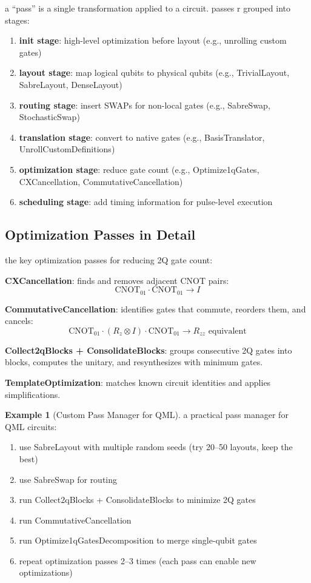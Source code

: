 \documentclass[11pt,a4paper]{article}
\theoremstyle{definition}
\newtheorem{example}{Example}[section]
\theoremstyle{remark}
\begin{document}
a ``pass'' is a single transformation applied to a circuit. passes r grouped into stages:

\begin{enumerate}[label=\arabic*.]
    \item \textbf{init stage}: high-level optimization before layout (e.g., unrolling custom gates)
    \item \textbf{layout stage}: map logical qubits to physical qubits (e.g., TrivialLayout, SabreLayout, DenseLayout)
    \item \textbf{routing stage}: insert SWAPs for non-local gates (e.g., SabreSwap, StochasticSwap)
    \item \textbf{translation stage}: convert to native gates (e.g., BasisTranslator, UnrollCustomDefinitions)
    \item \textbf{optimization stage}: reduce gate count (e.g., Optimize1qGates, CXCancellation, CommutativeCancellation)
    \item \textbf{scheduling stage}: add timing information for pulse-level execution
\end{enumerate}

\subsection{Optimization Passes in Detail}

the key optimization passes for reducing 2Q gate count:

\textbf{CXCancellation}: finds and removes adjacent CNOT pairs:
\[
\text{CNOT}_{01} \cdot \text{CNOT}_{01} \to I
\]

\textbf{CommutativeCancellation}: identifies gates that commute, reorders them, and cancels:
\[
\text{CNOT}_{01} \cdot (R_z \otimes I) \cdot \text{CNOT}_{01} \to R_{zz} \text{ equivalent}
\]

\textbf{Collect2qBlocks + ConsolidateBlocks}: groups consecutive 2Q gates into blocks, computes the unitary, and resynthesizes with minimum gates.

\textbf{TemplateOptimization}: matches known circuit identities and applies simplifications.

\begin{example}[Custom Pass Manager for QML]
a practical pass manager for QML circuits:
\begin{enumerate}[label=\arabic*.]
    \item use SabreLayout with multiple random seeds (try 20--50 layouts, keep the best)
    \item use SabreSwap for routing
    \item run Collect2qBlocks + ConsolidateBlocks to minimize 2Q gates
    \item run CommutativeCancellation
    \item run Optimize1qGatesDecomposition to merge single-qubit gates
    \item repeat optimization passes 2--3 times (each pass can enable new optimizations)
\end{enumerate}
\end{example}
\end{document}
